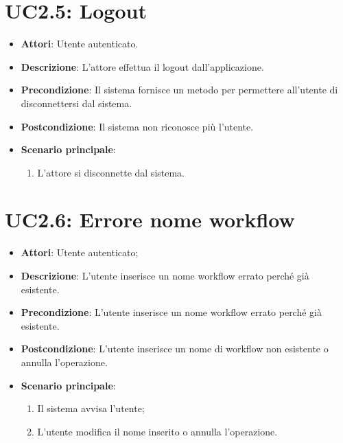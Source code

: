 \section{UC2.5: Logout}
\label{UC2.5}
\begin{itemize}
	\item \textbf{Attori}: Utente autenticato.
	\item \textbf{Descrizione}: L'attore effettua il logout dall'applicazione.
	\item \textbf{Precondizione}: Il sistema fornisce un metodo per permettere all'utente di disconnettersi dal sistema.
	\item \textbf{Postcondizione}: Il sistema non riconosce più l'utente.
	\item \textbf{Scenario principale}:
	\begin{enumerate} \item L'attore si disconnette dal sistema.\end{enumerate}
\end{itemize}

\section{UC2.6: Errore nome workflow}
\label{UC2.6}
\begin{itemize}
	\item \textbf{Attori}: Utente autenticato;
	\item \textbf{Descrizione}: L'utente inserisce un nome workflow errato perché già esistente.
	\item \textbf{Precondizione}: L'utente inserisce un nome workflow errato perché  già esistente.
	\item \textbf{Postcondizione}: L'utente inserisce un nome di workflow non esistente o annulla l'operazione.
	\item \textbf{Scenario principale}:
	\begin{enumerate} \item Il sistema avvisa l'utente;  \item  L'utente modifica il nome inserito o annulla l'operazione.\end{enumerate}
\end{itemize}


